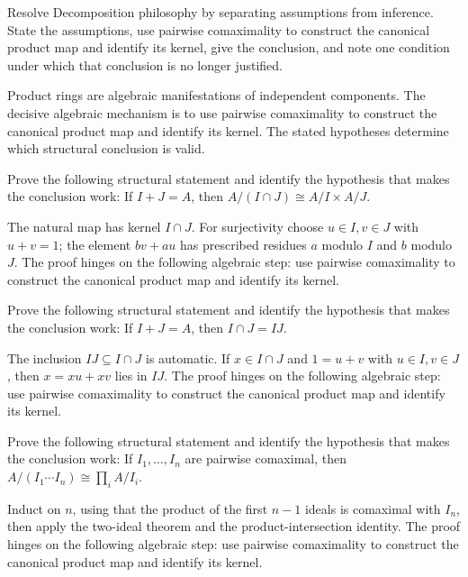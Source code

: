 \begin{problem}\label{prob:v04-problem-08}
Resolve Decomposition philosophy by separating assumptions from inference. State the assumptions, use pairwise comaximality to construct the canonical product map and identify its kernel, give the conclusion, and note one condition under which that conclusion is no longer justified.
\end{problem}
\begin{solution}
Product rings are algebraic manifestations of independent components. The decisive algebraic mechanism is to use pairwise comaximality to construct the canonical product map and identify its kernel. The stated hypotheses determine which structural conclusion is valid.
\end{solution}

\begin{problem}\label{prob:v04-problem-09}
Prove the following structural statement and identify the hypothesis that makes the conclusion work: If $I+J=A$, then $A/(I\cap J)\cong A/I\times A/J$.
\end{problem}
\begin{solution}
The natural map has kernel $I\cap J$. For surjectivity choose $u\in I,v\in J$ with $u+v=1$; the element $bv+au$ has prescribed residues $a$ modulo $I$ and $b$ modulo $J$. The proof hinges on the following algebraic step: use pairwise comaximality to construct the canonical product map and identify its kernel.
\end{solution}

\begin{problem}\label{prob:v04-problem-10}
Prove the following structural statement and identify the hypothesis that makes the conclusion work: If $I+J=A$, then $I\cap J=IJ$.
\end{problem}
\begin{solution}
The inclusion $IJ\subseteq I\cap J$ is automatic. If $x\in I\cap J$ and $1=u+v$ with $u\in I,v\in J$, then $x=xu+xv$ lies in $IJ$. The proof hinges on the following algebraic step: use pairwise comaximality to construct the canonical product map and identify its kernel.
\end{solution}

\begin{problem}\label{prob:v04-problem-11}
Prove the following structural statement and identify the hypothesis that makes the conclusion work: If $I_1,\dots,I_n$ are pairwise comaximal, then $A/(I_1\cdots I_n)\cong\prod_i A/I_i$.
\end{problem}
\begin{solution}
Induct on $n$, using that the product of the first $n-1$ ideals is comaximal with $I_n$, then apply the two-ideal theorem and the product-intersection identity. The proof hinges on the following algebraic step: use pairwise comaximality to construct the canonical product map and identify its kernel.
\end{solution}

